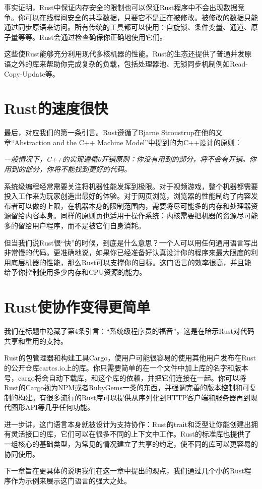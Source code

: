 事实证明，Rust中保证内存安全的限制也可以保证Rust程序中不会出现数据竞争。你可以在线程间安全的共享数据，只要它不是正在被修改。被修改的数据只能通过同步原语来访问。所有传统的工具都可以使用：自旋锁、条件变量、通道、原子量等等。Rust会通过检查确保你正确地使用它们。

这些使Rust能够充分利用现代多核机器的性能。Rust的生态还提供了普通并发原语之外的库来帮助你完成复杂的负载，包括处理器池、无锁同步机制例如Read-Copy-Update等。

\section{Rust的速度很快}
最后，对应我们的第一条引言。Rust遵循了Bjarne Stroustrup在他的文章“Abstraction and the C++ Machine Model”中提到的为C++设计的原则：

\emph{一般情况下，C++的实现遵循0开销原则：你没有用到的部分，将不会有开销。你用到的部分，你将不能找到更好的代码。}

系统级编程经常需要关注将机器性能发挥到极限。对于视频游戏，整个机器都需要投入工作来为玩家创造出最好的体验。对于网页浏览，浏览器的性能制约了内容发布者可以做的上限，在机器本身的限制范围内，需要将尽可能多的内存和处理器资源留给内容本身。同样的原则页也适用于操作系统：内核需要把机器的资源尽可能多的留给用户程序，而不是被它们自身消耗。

但当我们说Rust很“快”的时候，到底是什么意思？一个人可以用任何通用语言写出非常慢的代码。更准确地说，如果你已经准备好认真设计你的程序来最大限度的利用底层机器的性能，那么Rust可以支撑你的目标。这门语言的效率很高，并且能给予你控制使用多少内存和CPU资源的能力。

\section{Rust使协作变得更简单}
我们在标题中隐藏了第4条引言：“系统级程序员的福音”。这是在暗示Rust对代码共享和重用的支持。

Rust的包管理器和构建工具Cargo，使用户可能很容易的使用其他用户发布在Rust的公开仓库cartes.io上的库。你只需要简单的在一个文件中加上库的名字和版本号，cargo将会自动下载库，和这个库的依赖，并把它们连接在一起。你可以将Rust的Cargo视为NPM或者RubyGems一类的东西，并强调完善的版本控制和可复制的构建。有很多流行的Rust库可以提供从序列化到HTTP客户端和服务器再到现代图形API等几乎任何功能。

进一步讲，这门语言本身就被设计为支持协作：Rust的trait和泛型让你能创建出拥有灵活接口的库，它们可以在很多不同的上下文中工作。Rust的标准库也提供了一组核心的基础类型，为常见的情况建立了共享的约定，使不同的库可以更容易的协同使用。

下一章旨在更具体的说明我们在这一章中提出的观点，我们通过几个小的Rust程序作为示例来展示这门语言的强大之处。